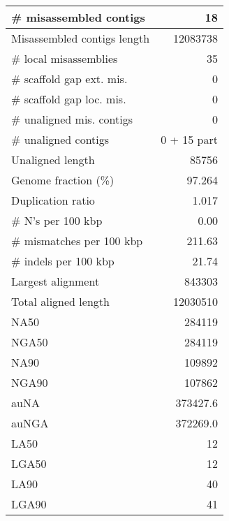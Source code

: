 \documentclass[12pt,a4paper]{article}
\begin{document}
\begin{table}[ht]
\begin{center}
\begin{tabular}{|l*{1}{|r}|}
\# misassembled contigs & 18 \\ \hline
Misassembled contigs length & 12083738 \\ \hline
\# local misassemblies & 35 \\ \hline
\# scaffold gap ext. mis. & 0 \\ \hline
\# scaffold gap loc. mis. & 0 \\ \hline
\# unaligned mis. contigs & 0 \\ \hline
\# unaligned contigs & 0 + 15 part \\ \hline
Unaligned length & 85756 \\ \hline
Genome fraction (\%) & 97.264 \\ \hline
Duplication ratio & 1.017 \\ \hline
\# N's per 100 kbp & 0.00 \\ \hline
\# mismatches per 100 kbp & 211.63 \\ \hline
\# indels per 100 kbp & 21.74 \\ \hline
Largest alignment & 843303 \\ \hline
Total aligned length & 12030510 \\ \hline
NA50 & 284119 \\ \hline
NGA50 & 284119 \\ \hline
NA90 & 109892 \\ \hline
NGA90 & 107862 \\ \hline
auNA & 373427.6 \\ \hline
auNGA & 372269.0 \\ \hline
LA50 & 12 \\ \hline
LGA50 & 12 \\ \hline
LA90 & 40 \\ \hline
LGA90 & 41 \\ \hline
\end{tabular}
\end{center}
\end{table}
\end{document}
